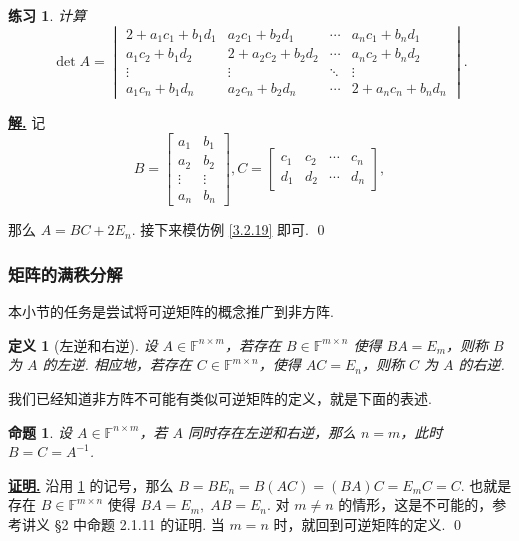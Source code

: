 \documentclass[10pt,openany]{article}
\theoremstyle{thmstyle} %
\newtheorem{practice}{练习}[section]
\theoremstyle{defstyle} %
\newtheorem{definition}[theorem]{定义}
\theoremstyle{prostyle} %
\newtheorem{proposition}[theorem]{命题}
\theoremstyle{exastyle}
\theoremstyle{remstyle}
\renewenvironment{proof}[1][证明]{\par\underline{\textbf{#1.}} \;\fangsong}{\qed\par}
\newenvironment{solution}{\par\underline{\textbf{解.}} \;\fangsong}{\qed\par}
\newcommand{\F}{\mathbb{F}}
\newcommand{\mn}{^{m \times n}}
\newcommand{\nm}{^{n \times m}}
\begin{document}
\begin{practice}
	计算
	\[ \det A=\begin{vmatrix}
		2 + a_1 c_1 + b_1 d_1 & a_2 c_1 + b_2 d_1 & \cdots & a_n c_1 + b_n d_1 \\
		a_1 c_2 + b_1 d_2 & 2 + a_2 c_2 + b_2 d_2 & \cdots & a_n c_2 + b_n d_2 \\
		\vdots & \vdots & \ddots & \vdots \\
		a_1 c_n + b_1 d_n & a_2 c_n + b_2 d_n & \cdots & 2 + a_n c_n + b_n d_n
	\end{vmatrix}. \]
\end{practice}

\begin{solution}
	记
	\[ B=\begin{bmatrix}
		a_1 & b_1 \\ 
		a_2 & b_2 \\
		\vdots & \vdots \\
		a_n & b_n
	\end{bmatrix}, C=\begin{bmatrix}
	  c_1 & c_2 & \cdots & c_n \\
	  d_1 & d_2 & \cdots & d_n
	\end{bmatrix}, \]
	
	那么 \( A=BC+2E_n \). 接下来模仿例 \ref{3.2.19} 即可.
\end{solution}

\subsubsection{矩阵的满秩分解} \label{sec3.2.4}

本小节的任务是尝试将可逆矩阵的概念推广到非方阵.

\begin{definition}[左逆和右逆] \label{3.2.20}
	设 \( A \in \F\nm \)，若存在 \( B \in \F\mn \) 使得 \( BA=E_m \)，则称 \( B \) 为 \( A \) 的左逆. 相应地，若存在 \( C \in \F\mn \)，使得 \( AC=E_n \)，则称 \( C \) 为 \( A \) 的右逆.
\end{definition}

我们已经知道非方阵不可能有类似可逆矩阵的定义，就是下面的表述.

\begin{proposition}
   设 \( A \in \F\nm \)，若 \( A \) 同时存在左逆和右逆，那么 \( n=m \)，此时 \(  B=C=A^{-1} \).
\end{proposition}

\begin{proof}
   沿用 \ref{3.2.20} 的记号，那么 \( B=B E_n=B(AC)=(B A)C=E_mC=C \). 也就是存在 \( B \in \F\mn \) 使得 \( BA=E_m, \; AB=E_n \). 对 \( m \neq n \) 的情形，这是不可能的，参考讲义 \S 2 中命题 2.1.11 的证明. 当 \( m=n \) 时，就回到可逆矩阵的定义.
\end{proof}
\end{document}
